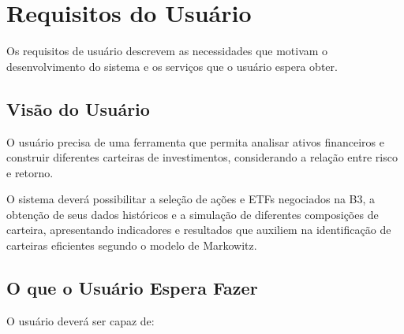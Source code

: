 
\section{Requisitos do Usuário}

Os requisitos de usuário descrevem as necessidades que motivam o
desenvolvimento do sistema e os serviços que o usuário espera obter.


\subsection{Visão do Usuário}

O usuário precisa de uma ferramenta que permita analisar ativos financeiros
e construir diferentes carteiras de investimentos,
considerando a relação entre risco e retorno.

O sistema deverá possibilitar a seleção de ações e ETFs negociados na B3,
a obtenção de seus dados históricos e a simulação de diferentes
composições de carteira, apresentando indicadores e resultados
que auxiliem na identificação de carteiras eficientes segundo
o modelo de Markowitz.

\subsection{O que o Usuário Espera Fazer}

O usuário deverá ser capaz de:

